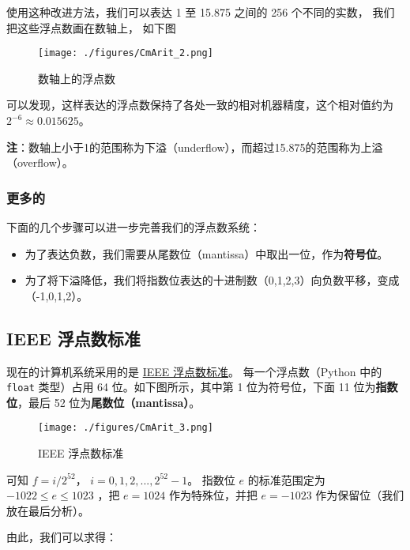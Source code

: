 使用这种改进方法，我们可以表达 1 至 15.875 之间的 256 个不同的实数， 我们把这些浮点数画在数轴上， 如下图

\begin{figure}[ht]
\centering
\texttt{[image: ./figures/CmArit\_2.png]}
\caption{数轴上的浮点数} \label{CmArit_fig2}
\end{figure}

可以发现，这样表达的浮点数保持了各处一致的相对机器精度，这个相对值约为 $2^{-6}\approx 0.015625$。

\textbf{注}：数轴上小于1的范围称为下溢（underflow），而超过15.875的范围称为上溢（overflow）。

\subsubsection{更多的}

下面的几个步骤可以进一步完善我们的浮点数系统：
\begin{itemize}
\item 为了表达负数，我们需要从尾数位（mantissa）中取出一位，作为\textbf{符号位}。 
\item 为了将下溢降低，我们将指数位表达的十进制数（0,1,2,3）向负数平移，变成（-1,0,1,2）。
\end{itemize}

\subsection{IEEE 浮点数标准}

现在的计算机系统采用的是 \href{https://ieeexplore.ieee.org/document/8766229}{IEEE 浮点数标准}。 每一个浮点数（Python 中的 \verb|float| 类型）占用 64 位。如下图所示，其中第 1 位为符号位，下面 11 位为\textbf{指数位}，最后 52 位为\textbf{尾数位（mantissa）}。

\begin{figure}[ht]
\centering
\texttt{[image: ./figures/CmArit\_3.png]}
\caption{IEEE 浮点数标准} \label{CmArit_fig3}
\end{figure}

可知 $f= {i}/{2^{52}}$， $i=0,1,2,...,2^{52}-1$。 指数位  $e$  的标准范围定为  $-1022\le e\le 1023$  ，把  $e=1024$  作为特殊位，并把  $e=-1023$  作为保留位（我们放在最后分析）。

由此，我们可以求得：

